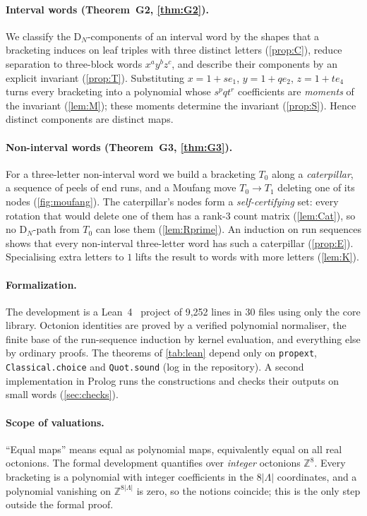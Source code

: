 \documentclass[11pt,a4paper]{article}
\theoremstyle{definition}
\theoremstyle{remark}
\newcommand{\ZZ}{\mathbb{Z}}
\newcommand{\DN}{\mathrm{D}_N}
\begin{document}
\paragraph{Interval words (Theorem~G2, \cref{thm:G2}).} We classify the $\DN$-components of an interval
word by the shapes that a bracketing induces on leaf triples with three distinct letters
(\cref{prop:C}), reduce separation to three-block words $x^ay^bz^c$, and describe their components by an
explicit invariant (\cref{prop:T}). Substituting $x=1+se_1$, $y=1+qe_2$, $z=1+te_4$ turns every
bracketing into a polynomial whose $s^pqt^r$ coefficients are \emph{moments} of the invariant
(\cref{lem:M}); these moments determine the invariant (\cref{prop:S}). Hence distinct components are
distinct maps.

\paragraph{Non-interval words (Theorem~G3, \cref{thm:G3}).} For a three-letter non-interval word we build
a bracketing $T_0$ along a \emph{caterpillar}, a sequence of peels of end runs, and a Moufang move
$T_0\to T_1$ deleting one of its nodes (\cref{fig:moufang}). The caterpillar's nodes form a
\emph{self-certifying} set: every rotation that would delete one of them has a rank-$3$ count matrix
(\cref{lem:Cat}), so no $\DN$-path from $T_0$ can lose them (\cref{lem:Rprime}). An induction on run
sequences shows that every non-interval three-letter word has such a caterpillar (\cref{prop:E}).
Specialising extra letters to $1$ lifts the result to words with more letters (\cref{lem:K}).

\paragraph{Formalization.} The development is a Lean~4~\cite{Lean} project of 9{,}252 lines in 30 files
using only the core library. Octonion identities are proved by a verified polynomial normaliser, the
finite base of the run-sequence induction by kernel evaluation, and everything else by ordinary proofs.
The theorems of \cref{tab:lean} depend only on \texttt{propext}, \texttt{Classical.choice} and
\texttt{Quot.sound} (log in the repository). A second implementation in Prolog runs the constructions and
checks their outputs on small words (\cref{sec:checks}).

\paragraph{Scope of valuations.} ``Equal maps'' means equal as polynomial maps, equivalently equal on
all real octonions. The formal development quantifies over \emph{integer} octonions $\ZZ^8$. Every
bracketing is a polynomial with integer coefficients in the $8\lvert\Lambda\rvert$ coordinates, and a
polynomial vanishing on $\ZZ^{8\lvert\Lambda\rvert}$ is zero, so the notions coincide; this is the only step
outside the formal proof.
\end{document}

